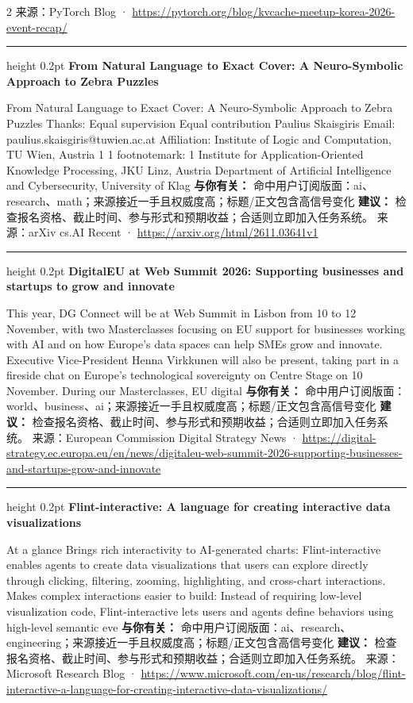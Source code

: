 \documentclass[10.5pt]{ctexart}
\begin{document}
\begin{multicols}{2}
{\footnotesize\color{ormuted} 来源：PyTorch Blog · \url{https://pytorch.org/blog/kvcache-meetup-korea-2026-event-recap/}}
\vspace{2mm}
\hrule height 0.2pt
\vspace{2mm}
{\large\bfseries From Natural Language to Exact Cover: A Neuro-Symbolic Approach to Zebra Puzzles}\par
From Natural Language to Exact Cover: A Neuro-Symbolic Approach to Zebra Puzzles Thanks: Equal supervision Equal contribution Paulius Skaisgiris Email: paulius.skaisgiris@tuwien.ac.at Affiliation: Institute of Logic and Computation, TU Wien, Austria 1 1 footnotemark: 1 Institute for Application-Oriented Knowledge Processing, JKU Linz, Austria Department of Artificial Intelligence and Cybersecurity, University of Klag
\textbf{与你有关：} 命中用户订阅版面：ai、research、math；来源接近一手且权威度高；标题/正文包含高信号变化
\textbf{建议：} 检查报名资格、截止时间、参与形式和预期收益；合适则立即加入任务系统。
{\footnotesize\color{ormuted} 来源：arXiv cs.AI Recent · \url{https://arxiv.org/html/2611.03641v1}}
\vspace{2mm}
\hrule height 0.2pt
\vspace{2mm}
{\large\bfseries DigitalEU at Web Summit 2026: Supporting businesses and startups to grow and innovate}\par
This year, DG Connect will be at Web Summit in Lisbon from 10 to 12 November, with two Masterclasses focusing on EU support for businesses working with AI and on how Europe’s data spaces can help SMEs grow and innovate. Executive Vice-President Henna Virkkunen will also be present, taking part in a fireside chat on Europe’s technological sovereignty on Centre Stage on 10 November. During our Masterclasses, EU digital
\textbf{与你有关：} 命中用户订阅版面：world、business、ai；来源接近一手且权威度高；标题/正文包含高信号变化
\textbf{建议：} 检查报名资格、截止时间、参与形式和预期收益；合适则立即加入任务系统。
{\footnotesize\color{ormuted} 来源：European Commission Digital Strategy News · \url{https://digital-strategy.ec.europa.eu/en/news/digitaleu-web-summit-2026-supporting-businesses-and-startups-grow-and-innovate}}
\vspace{2mm}
\hrule height 0.2pt
\vspace{2mm}
{\large\bfseries Flint-interactive: A language for creating interactive data visualizations}\par
At a glance Brings rich interactivity to AI-generated charts: Flint-interactive enables agents to create data visualizations that users can explore directly through clicking, filtering, zooming, highlighting, and cross-chart interactions. Makes complex interactions easier to build: Instead of requiring low-level visualization code, Flint-interactive lets users and agents define behaviors using high-level semantic eve
\textbf{与你有关：} 命中用户订阅版面：ai、research、engineering；来源接近一手且权威度高；标题/正文包含高信号变化
\textbf{建议：} 检查报名资格、截止时间、参与形式和预期收益；合适则立即加入任务系统。
{\footnotesize\color{ormuted} 来源：Microsoft Research Blog · \url{https://www.microsoft.com/en-us/research/blog/flint-interactive-a-language-for-creating-interactive-data-visualizations/}}
\end{multicols}
\end{document}

